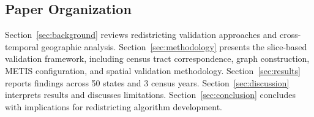\subsection{Paper Organization}

Section~\ref{sec:background} reviews redistricting validation approaches and cross-temporal geographic analysis. Section~\ref{sec:methodology} presents the slice-based validation framework, including census tract correspondence, graph construction, METIS configuration, and spatial validation methodology. Section~\ref{sec:results} reports findings across 50 states and 3 census years. Section~\ref{sec:discussion} interprets results and discusses limitations. Section~\ref{sec:conclusion} concludes with implications for redistricting algorithm development.
